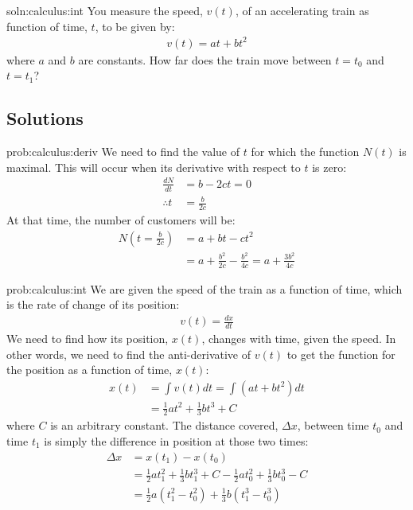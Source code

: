 \begin{problem}{soln:calculus:int}{\label{prob:calculus:int} You measure the speed, $v(t)$, of an accelerating train as function of time, $t$, to be given by:
\begin{align*}
v(t)=at+bt^2
\end{align*}
where $a$ and $b$ are constants. How far does the train move between $t=t_0$ and $t=t_1$?
}
\end{problem}

\newpage
\subsection{Solutions}

\begin{solution}{prob:calculus:deriv}\label{soln:calculus:deriv}
We need to find the value of $t$ for which the function $N(t)$ is maximal. This will occur when its derivative with respect to $t$ is zero:
\begin{align*}
\frac{dN}{dt} &= b-2ct =0\\
\therefore t &= \frac{b}{2c}
\end{align*}
At that time, the number of customers will be:
\begin{align*}
N\left( t=\frac{b}{2c} \right) &=a+bt-ct^2\\
&=a+\frac{b^2}{2c} - \frac{b^2}{4c} = a+\frac{3b^2}{4c}
\end{align*}
\end{solution}

\begin{solution}{prob:calculus:int}\label{soln:calculus:int} We are given the speed of the train as a function of time, which is the rate of change of its position:
\begin{align*}
v(t)=\frac{dx}{dt}
\end{align*}
We need to find how its position, $x(t)$, changes with time, given the speed. In other words, we need to find the anti-derivative of $v(t)$ to get the function for the position as a function of time, $x(t)$:
\begin{align*}
x(t) &= \int v(t) dt = \int (at+bt^2) dt\\
&=\frac{1}{2}at^2 + \frac{1}{3}bt^3 + C
\end{align*}
where $C$ is an arbitrary constant. The distance covered, $\Delta x$, between time $t_0$ and time $t_1$ is simply the difference in position at those two times:
\begin{align*}
\Delta x &= x(t_1) - x(t_0)\\
&=\frac{1}{2}at_1^2 + \frac{1}{3}bt_1^3 + C - \frac{1}{2}at_0^2 + \frac{1}{3}bt_0^3 - C\\
&=\frac{1}{2}a(t_1^2-t_0^2) + \frac{1}{3}b(t_1^3-t_0^3)
\end{align*}


\end{solution}